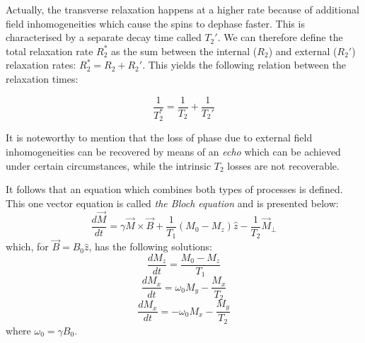     

Actually, the transverse relaxation happens at a higher rate because of additional field inhomogeneities which cause the spins to dephase faster. This is characterised by a separate decay time called $T_2'$. We can therefore define the total relaxation rate $R_2^*$ as the sum between the internal ($R_2$) and external ($R_2'$) relaxation rates: $R_2^* = R_2 + R_2'$. This yields the following relation between the relaxation times:

\begin{equation} \label{eq:231}
    \frac{1}{T_2^*} = \frac{1}{T_2} + \frac{1}{T_2'}
\end{equation}

It is noteworthy to mention that the loss of phase due to external field inhomogeneities can be recovered by means of an \textit{echo} which can be achieved under certain circumstances, while the intrinsic $T_2$ losses are not recoverable. 

It follows that an equation which combines both types of processes is defined. This one vector equation is called \textit{the Bloch equation} and is presented below:
\begin{equation} \label{eq:232}
    \frac{d\vec{M}}{dt} = \gamma \vec{M} \times \vec{B} + \frac{1}{T_1} (M_0 - M_z) \hat{z} - \frac{1}{T_2} \vec{M}_{\perp}
\end{equation} 
which, for $\vec{B} = B_0 \hat{z}$, has the following solutions:
\begin{equation} \label{eq:233}
    \frac{dM_z}{dt} = \frac{M_0 - M_z}{T_1}
\end{equation}
\begin{equation} \label{eq:234}
    \frac{dM_x}{dt} = \omega_0 M_y - \frac{M_x}{T_2}
\end{equation}
\begin{equation} \label{eq:235}
    \frac{dM_x}{dt} = -\omega_0 M_x - \frac{M_y}{T_2}
\end{equation}
where $\omega_0 = \gamma B_0$.

